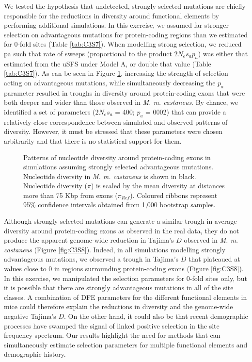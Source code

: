 	We tested the hypothesis that undetected, strongly selected mutations are chiefly responsible for the reductions in diversity around functional elements by performing additional simulations. In this exercise, we assumed far stronger selection on advantageous mutations for protein-coding regions than we estimated for 0-fold sites (Table \ref{tab:C3S7}). When modelling strong selection, we reduced pa such that rate of sweeps (proportional to the product $2N_es_ap_a$) was either that estimated from the uSFS under Model A, or double that value (Table \ref{tab:C3S7}). As can be seen in Figure \ref{fig:strongSelection}, increasing the strength of selection acting on advantageous mutations, while simultaneously decreasing the $p_a$ parameter resulted in troughs in diversity around protein-coding exons that were both deeper and wider than those observed in \textit{M. m. castaneus}. By chance, we identified a set of parameters ($2N_es_a$ = 400; $p_a$ = 0002) that can provide a relatively close correspondence between simulated and observed patterns of diversity. However, it must be stressed that these parameters were chosen arbitrarily and that there is no statistical support for them.

\begin{figure}[H]
   \centering      
   \noindent{}
 \caption[Reductions in diversity around exons caused by strong positive selection]{Patterns of nucleotide diversity around protein-coding exons in simulations assuming strongly selected advantageous mutations. Nucleotide diversity in \textit{M. m. castaneus} is shown in black. Nucleotide diversity ($\pi$) is scaled by the mean diversity at distances more than 75 Kbp from exons ($\pi_{Ref}$). Coloured ribbons represent 95\% confidence intervals obtained from 1,000 bootstrap samples.}
 \label{fig:strongSelection}
\end{figure}

	Although strongly selected mutations can generate a similar trough in average diversity around protein-coding exons as observed in the real data, they do not produce the apparent genome-wide reduction in Tajima’s $D$ observed in \textit{M. m. castaneus} (Figure \ref{fig:C3S8}). Indeed, in all simulations modelling strongly advantageous mutations, we observed a trough in Tajima’s $D$ that plateaued at values close to 0 in regions surrounding protein-coding exons (Figure \ref{fig:C3S8}). In this exercise, we manipulated the selection parameters for 0-fold sites only, but it is possible that there are strongly advantageous mutations in all of the site classes. A combination of DFE parameters for the different functional elements in mice could therefore explain the reductions in diversity and the genome-wide negative Tajima’s $D$. On the other hand, it could also be that recent demographic processes have swamped the signal of linked positive selection in the site frequency spectrum.  Our results highlight the need for methods that can simultaneously estimate selection parameters for multiple functional elements and demographic history. 

